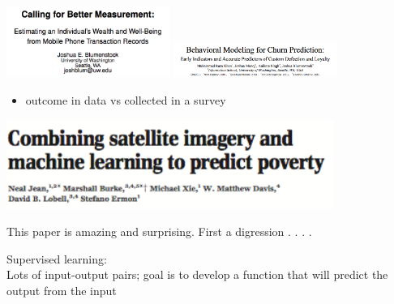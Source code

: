 \documentclass[aspectratio=169]{beamer}
\def\vf{\vfill}
\begin{document}
\begin{frame}

\begin{center}
\includegraphics[width=0.4\textwidth]{figures/blumenstock_calling_2014_title}
\includegraphics[width=0.4\textwidth]{figures/khan_behavioral_2015_title}
\end{center}

\pause
\begin{itemize}
\item outcome in data vs collected in a survey
\end{itemize}

\end{frame}
\begin{frame}

\begin{center}
\includegraphics[width=0.8\textwidth]{figures/jean_combining_2016_title}
\end{center}

\vf

This paper is amazing and surprising.  First a digression . . . .

\end{frame}
\begin{frame}

Supervised learning:\\
Lots of input-output pairs; goal is to develop a function that will predict the output from the input

\end{frame}
\end{document}
